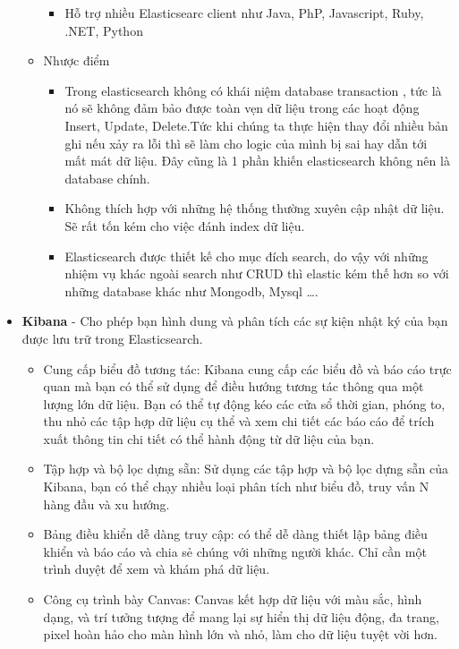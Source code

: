 \begin{itemize}
\begin{itemize}
\begin{itemize}
		            \item Hỗ trợ nhiều Elasticsearc client như Java, PhP, Javascript, Ruby, .NET, Python
		        \end{itemize}
		        \item Nhược điểm
		        \begin{itemize}
		            \item Trong elasticsearch không có khái niệm database transaction , tức là nó sẽ không đảm bảo được toàn vẹn dữ liệu trong các hoạt động Insert, Update, Delete.Tức khi chúng ta thực hiện thay đổi nhiều bản ghi nếu xảy ra lỗi thì sẽ làm cho logic của mình bị sai hay dẫn tới mất mát dữ liệu. Đây cũng là 1 phần khiến elasticsearch không nên là database chính.
		            \item Không thích hợp với những hệ thống thường xuyên cập nhật dữ liệu. Sẽ rất tốn kém cho việc đánh index dữ liệu.
		            \item Elasticsearch được thiết kế cho mục đích search, do vậy với những nhiệm vụ khác ngoài search như CRUD thì elastic kém thế hơn so với những database khác như Mongodb, Mysql ….
		        \end{itemize}
		    \end{itemize}
		    \item \textbf{Kibana} - Cho phép bạn hình dung và phân tích các sự kiện nhật ký của bạn được lưu trữ trong Elasticsearch.
		    \begin{itemize}
		        \item Cung cấp biểu đồ tương tác: Kibana cung cấp các biểu đồ và báo cáo trực quan mà bạn có thể sử dụng để điều hướng tương tác thông qua một lượng lớn dữ liệu. Bạn có thể tự động kéo các cửa sổ thời gian, phóng to, thu nhỏ các tập hợp dữ liệu cụ thể và xem chi tiết các báo cáo để trích xuất thông tin chi tiết có thể hành động từ dữ liệu của bạn.
		        \item Tập hợp và bộ lọc dựng sẵn: Sử dụng các tập hợp và bộ lọc dựng sẵn của Kibana, bạn có thể chạy nhiều loại phân tích như biểu đồ, truy vấn N hàng đầu và xu hướng.
		        \item Bảng điều khiển dễ dàng truy cập: có thể dễ dàng thiết lập bảng điều khiển và báo cáo và chia sẻ chúng với những người khác. Chỉ cần một trình duyệt để xem và khám phá dữ liệu.
		        \item Công cụ trình bày Canvas: Canvas kết hợp dữ liệu với màu sắc, hình dạng, và trí tưởng tượng để mang lại sự hiển thị dữ liệu động, đa trang, pixel hoàn hảo cho màn hình lớn và nhỏ, làm cho dữ liệu tuyệt vời hơn.

\end{itemize}
\end{itemize}
